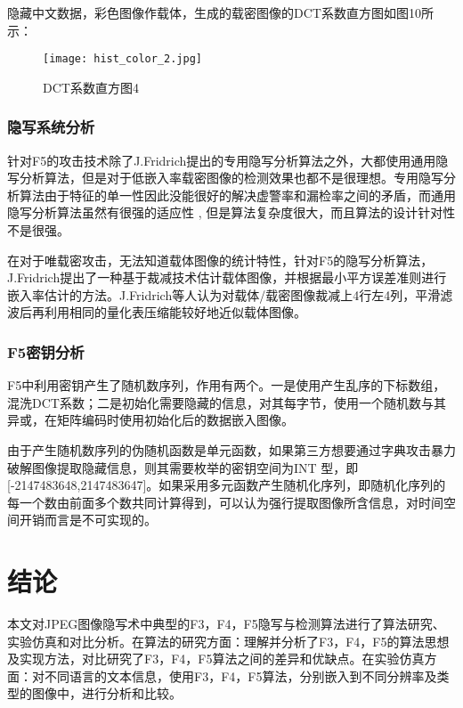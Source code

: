\documentclass[onecolumn,a4paper,12pt]{article}
\begin{document}
隐藏中文数据，彩色图像作载体，生成的载密图像的DCT系数直方图如图10所示：
\begin{figure}[H]
  \centering
  \texttt{[image: hist\_color\_2.jpg]}\\
  \caption{DCT系数直方图4}\label{DCT系数直方图4}
\end{figure}

\subsubsection{隐写系统分析}

针对F5的攻击技术除了J.Fridrich提出的专用隐写分析算法之外，大都使用通用隐写分析算法，但是对于低嵌入率载密图像的检测效果也都不是很理想。专用隐写分析算法由于特征的单一性因此没能很好的解决虚警率和漏检率之间的矛盾，而通用隐写分析算法虽然有很强的适应性 , 但是算法复杂度很大，而且算法的设计针对性不是很强。

在对于唯载密攻击，无法知道载体图像的统计特性，针对F5的隐写分析算法，J.Fridrich提出了一种基于裁减技术估计载体图像，并根据最小平方误差准则进行嵌入率估计的方法。J.Fridrich等人认为对载体/载密图像裁减上4行左4列，平滑滤波后再利用相同的量化表压缩能较好地近似载体图像。

\subsubsection{F5密钥分析}

F5中利用密钥产生了随机数序列，作用有两个。一是使用产生乱序的下标数组，混洗DCT系数；二是初始化需要隐藏的信息，对其每字节，使用一个随机数与其异或，在矩阵编码时使用初始化后的数据嵌入图像。

由于产生随机数序列的伪随机函数是单元函数，如果第三方想要通过字典攻击暴力破解图像提取隐藏信息，则其需要枚举的密钥空间为INT 型，即[-2147483648,2147483647]。如果采用多元函数产生随机化序列，即随机化序列的每一个数由前面多个数共同计算得到，可以认为强行提取图像所含信息，对时间空间开销而言是不可实现的。

\section{结论}

本文对JPEG图像隐写术中典型的F3，F4，F5隐写与检测算法进行了算法研究、实验仿真和对比分析。在算法的研究方面：理解并分析了F3，F4，F5的算法思想及实现方法，对比研究了F3，F4，F5算法之间的差异和优缺点。在实验仿真方面：对不同语言的文本信息，使用F3，F4，F5算法，分别嵌入到不同分辨率及类型的图像中，进行分析和比较。
\end{document}
